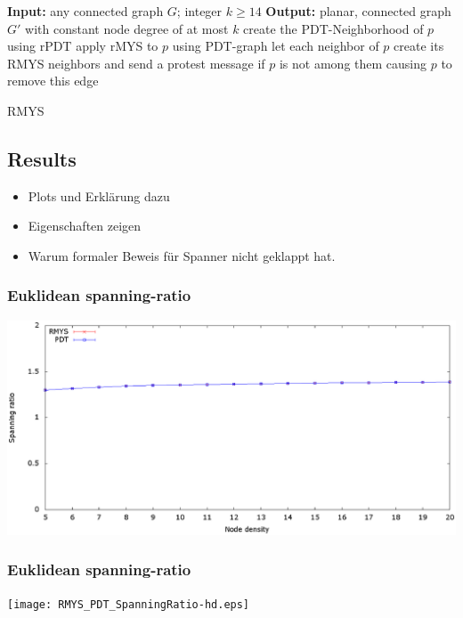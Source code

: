 \documentclass[compress]{beamer}
\begin{document}
\begin{frame}
\begin{algorithm}[H]
\begin{algorithmic}[0]
\STATE \textbf{Input:} any connected graph $G $; integer $k\geq 14 $
\STATE \textbf{Output:} planar, connected graph $G' $ with constant node degree of at most $k $
\STATE create the PDT-Neighborhood of $p $ using rPDT
\STATE apply rMYS to $p $ using PDT-graph
\STATE let each neighbor of $p $ create its RMYS neighbors and send a protest message if $p $ is not among them causing $p $ to remove this edge
\ENDFOR
\end{algorithmic}
\caption{RMYS}
\end{algorithm}
\end{frame}


\subsection{Results}
\begin{frame}
\begin{itemize}
\item Plots und Erklärung dazu
\item Eigenschaften zeigen
\item Warum formaler Beweis für Spanner nicht geklappt hat.
\end{itemize}
\end{frame}

\begin{frame} 
\frametitle{Euklidean spanning-ratio}
\center	\includegraphics[width=1.0\linewidth]{RMYS_PDT_SpanningRatio.eps}
\end{frame}

\begin{frame} 
\frametitle{Euklidean spanning-ratio}
\center	\texttt{[image: RMYS\_PDT\_SpanningRatio-hd.eps]}
\end{frame}
\end{document}
